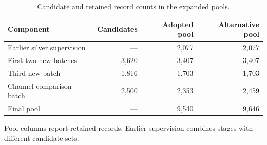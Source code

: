 \documentclass[fleqn,12pt]{wlpeerj}
\begin{document}
\setcounter{table}{21}
\begin{table}[!htbp]
\centering\small
\caption{Candidate and retained record counts in the expanded pools.}
\label{tab:source-stages}
\begin{tabularx}{\linewidth}{@{}Lrrr@{}}
\toprule Component & Candidates & Adopted pool & Alternative pool \\
\midrule
Earlier silver supervision & --- & 2,077 & 2,077 \\
First two new batches & 3,620 & 3,407 & 3,407 \\
Third new batch & 1,816 & 1,703 & 1,703 \\
Channel-comparison batch & 2,500 & 2,353 & 2,459 \\
\midrule
Final pool & --- & 9,540 & 9,646 \\
\bottomrule
\end{tabularx}
\par\smallskip\footnotesize\RaggedRight
Pool columns report retained records. Earlier supervision combines stages with different candidate sets.
\end{table}

\end{document}
